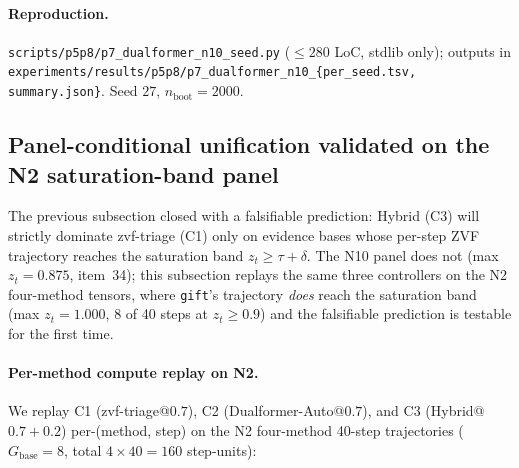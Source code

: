 \paragraph{Reproduction.}
\texttt{scripts/p5p8/p7\_dualformer\_n10\_seed.py} ($\leq 280$ LoC,
stdlib only); outputs in
\texttt{experiments/results/p5p8/p7\_dualformer\_n10\_\{per\_seed.tsv,
summary.json\}}. Seed $27$, $n_{\mathrm{boot}}{=}2000$.

\subsection{Panel-conditional unification validated on the N2
saturation-band panel}
\label{sec:p7-controller-hybrid-n2}

The previous subsection closed with a falsifiable prediction: Hybrid (C3)
will strictly dominate zvf-triage (C1) only on evidence bases whose
per-step ZVF trajectory reaches the saturation band $z_t \geq \tau + \delta$.
The N10 panel does not (max $z_t = 0.875$, item~34); this subsection
replays the same three controllers on the N2 four-method tensors, where
\texttt{gift}'s trajectory \emph{does} reach the saturation band (max
$z_t = 1.000$, 8 of 40 steps at $z_t \geq 0.9$) and the falsifiable
prediction is testable for the first time.

\paragraph{Per-method compute replay on N2.}
We replay C1 (zvf-triage@$0.7$), C2 (Dualformer-Auto@$0.7$), and
C3 (Hybrid@$0.7{+}0.2$) per-(method, step) on the N2 four-method
40-step trajectories ($G_{\mathrm{base}}{=}8$, total $4 \times 40 = 160$
step-units):

